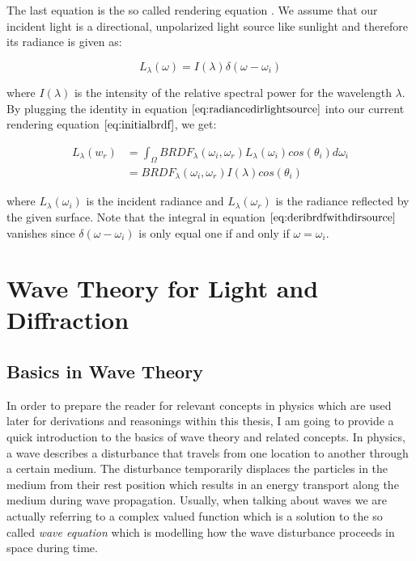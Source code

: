 The last equation is the so called rendering equation $\label{sec:dirlighsourceassumption}$. We assume that our incident light is a directional, unpolarized light source like sunlight and therefore its radiance is given as:

\begin{equation}
 L_{\lambda}(\omega)=I(\lambda)\delta(\omega-\omega_i)
\label{eq:radiancedirlightsource}
\end{equation}

where $I(\lambda)$ is the intensity of the relative spectral power for the wavelength $\lambda$. By plugging the identity in equation $\ref{eq:radiancedirlightsource}$ into our current rendering equation $\ref{eq:initialbrdf}$, we get:

\begin{align}
L_{\lambda}(w_r) 
& = \int_{\Omega} BRDF_{\lambda}(\omega_i, \omega_r) L_{\lambda}(\omega_i) cos(\theta_i) d\omega_i \nonumber \\
& = BRDF_{\lambda}(\omega_i, \omega_r) I(\lambda) cos(\theta_i)
\label{eq:deribrdfwithdirsource}
\end{align}

where $L_{\lambda}(\omega_i)$ is the incident radiance and $L_{\lambda}(\omega_r)$ is the radiance reflected by the given surface. Note that the integral in equation $\ref{eq:deribrdfwithdirsource}$ vanishes since $\delta(\omega-\omega_i)$ is only equal one if and only if $\omega = \omega_i$. 

\section{Wave Theory for Light and Diffraction}
\subsection{Basics in Wave Theory}
In order to prepare the reader for relevant concepts in physics which are used later for derivations and reasonings within this thesis, I am going to provide a quick introduction to the basics of wave theory and related concepts. In physics, a wave describes a disturbance that travels from one location to another through a certain medium. The disturbance temporarily displaces the particles in the medium from their rest position which results in an energy transport along the medium during wave propagation. Usually, when talking about waves we are actually referring to a complex valued function which is a solution to the so called \emph{wave equation} which is modelling how the wave disturbance proceeds in space during time. \\

